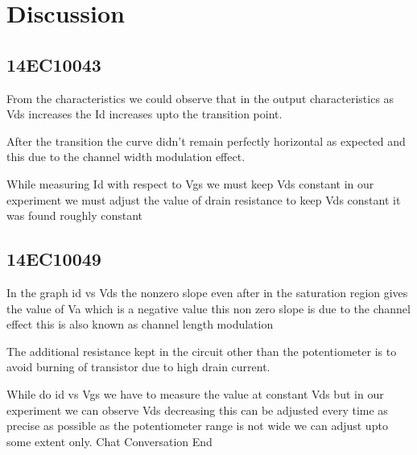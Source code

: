\documentclass[12pt]{article}
\begin{document}
\section*{Discussion}

\subsection*{14EC10043}
From the characteristics we could observe that in the output characteristics as Vds increases the Id increases upto the transition point.

After the transition the curve didn’t remain perfectly horizontal as expected and this due to the channel width modulation effect.

While measuring Id with respect to Vgs we must keep Vds constant in our experiment we must adjust the value of drain resistance to keep Vds constant it was found roughly constant

\subsection*{14EC10049}
 
In the graph id vs Vds the nonzero slope even after in the saturation region gives the value of Va which is a negative value this non zero slope is due to the channel effect this is also known as channel length modulation

The additional resistance kept in the circuit other than the potentiometer is to avoid burning of transistor due to high drain current.

While do id vs Vgs we have to measure the value at constant Vds but in our experiment we can observe Vds decreasing this can be adjusted every time as precise as possible as the potentiometer range is not wide we can adjust upto some extent only.
Chat Conversation End
\end{document}
